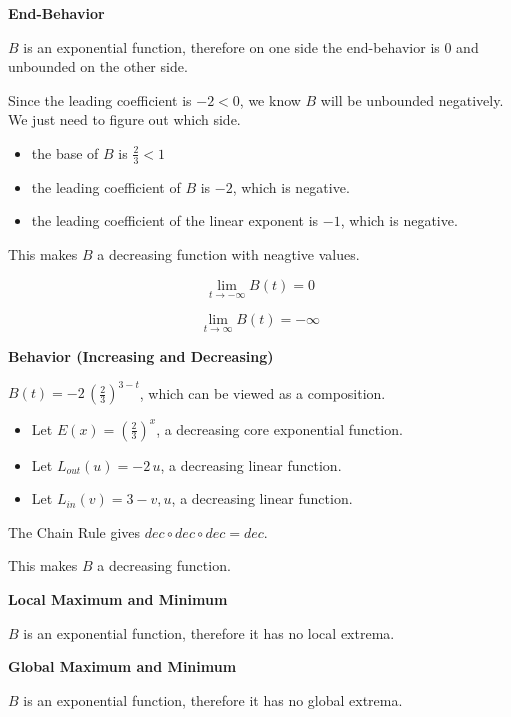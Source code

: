 \documentclass{ximera}
\begin{document}
\begin{example}
\textbf{End-Behavior}

$B$ is an exponential function, therefore on one side the end-behavior is $0$ and unbounded on the other side. 


Since the leading coefficient is $-2 < 0$, we know $B$ will be unbounded negatively.  We just need to figure out which side. 


\begin{itemize}
  \item the base of $B$ is $\frac{2}{3} < 1$
  \item the leading coefficient of $B$ is $-2$, which is negative.
  \item the leading coefficient of the linear exponent is $-1$, which is negative.
\end{itemize}


This makes $B$ a decreasing function with neagtive values. 


\[ \lim\limits_{t \to -\infty} B(t) = 0 \]

\[ \lim\limits_{t \to \infty} B(t) = -\infty \]




\textbf{Behavior (Increasing and  Decreasing)} 



$B(t) = -2 \, \left( \frac{2}{3} \right)^{3-t}$, which can be viewed as a composition.


\begin{itemize}
\item Let $E(x) = \left( \frac{2}{3} \right)^x$, a decreasing core exponential function.
\item Let $L_{out}(u) = -2\,u$, a decreasing linear function.
\item Let $L_{in}(v) = 3-v,u$, a decreasing linear function.
\end{itemize}


The Chain Rule gives $dec \circ dec \circ dec = dec$.


This makes $B$ a decreasing function. 






\textbf{Local Maximum and Minimum}

$B$ is an exponential function, therefore it has no local extrema. 





\textbf{Global Maximum and Minimum}

$B$ is an exponential function, therefore it has no global extrema. 






\end{example}
\end{document}
